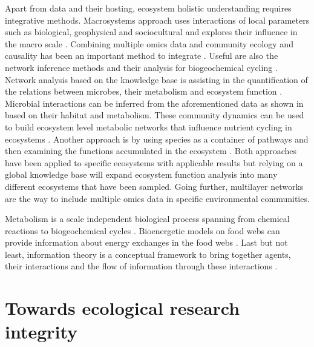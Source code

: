 Apart from data and their hosting, ecosystem holistic understanding requires
integrative methods. Macrosystems approach uses interactions of local parameters
such as biological, geophysical and sociocultural and explores their influence in
the macro scale \parencite{heffernan2014}. Combining multiple omics data and community ecology and causality has
been an important method to integrate \parencite{jurburg2022community}. Useful are also the network inference methods 
and their analysis for biogeochemical cycling \parencite{jameson2023Network}.
Network analysis based on the knowledge base is assisting in the quantification
of the relations between microbes, their metabolism and ecosystem
function \parencite{graham2016Microbes,muller2018Using, perez_garcia2016Metabolic}.
Microbial interactions can be inferred from the aforementioned data as shown
in \parencite{machado2021Polarization} based on their habitat and metabolism.
These community dynamics can be used to build ecosystem level metabolic
networks \parencite{perez_garcia2016Metabolic} that influence nutrient cycling in
ecosystems \parencite{bauer2018Network}. Another approach is by using species as a
container of pathways and then examining the functions accumulated in the
ecosystem \parencite{loucaDecouplingFunctionTaxonomy2016}. Both approaches have
been applied to specific ecosystems with applicable results but relying on a
global knowledge base will expand ecosystem function analysis into many
different ecosystems that have been sampled.
Going further, multilayer networks \parencite{marine-multilayers}
are the way to include multiple omics data in specific environmental communities. 

Metabolism is a scale independent biological process spanning from chemical reactions
to biogeochemical cycles \parencite{hall2018understanding}. Bioenergetic models on food 
webs can provide information about energy exchanges in the food webs \parencite{valdovinos2023bioenergetic}.
Last but not least, information theory is a conceptual framework to bring together agents,
their interactions and the flow of information through these interactions \parencite{oconnor-information-ecology}.



\section{Towards ecological research integrity}
\label{sec:integrity}


